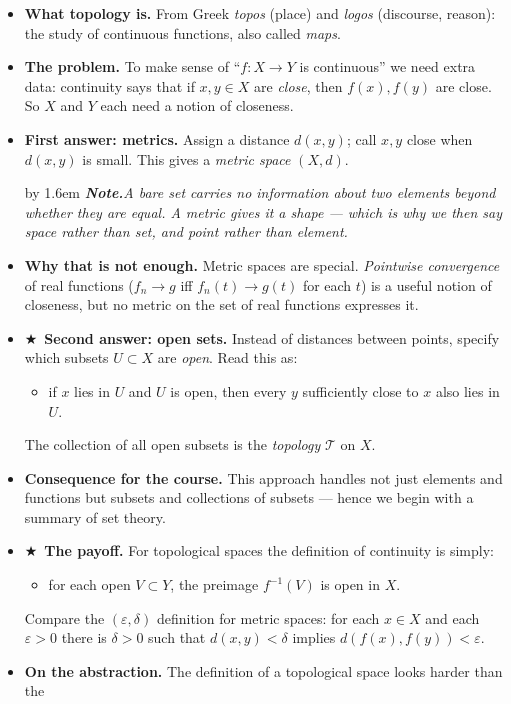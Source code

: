 \documentclass[12pt,a4paper]{article}
\newcommand{\Key}{$\bigstar$~}                  %
\newcommand{\Cue}[1]{%
  \par\addvspace{7pt}\nopagebreak
  \begingroup
    \advance\leftskip by 1.6em
    \parindent=0pt \small\color{cue}%
    \textbf{\textit{Note.}}\enspace \textit{#1}\par
  \endgroup
  \addvspace{9pt}}
\newenvironment{BL}%
  {\begin{itemize}[leftmargin=1.4em,labelsep=0.55em,itemsep=11pt,topsep=11pt,parsep=0pt]}%
  {\end{itemize}}
\newenvironment{SB}%
  {\begin{itemize}[label=--,leftmargin=1.3em,labelsep=0.45em,itemsep=6pt,topsep=7pt,parsep=0pt]}%
  {\end{itemize}}
\newcommand{\cT}{\mathcal{T}}
\begin{document}
\begin{BL}
\item \textbf{What topology is.} From Greek \emph{topos} (place) and \emph{logos}
      (discourse, reason): the study of continuous functions, also called \emph{maps}.
\item \textbf{The problem.} To make sense of ``$f\colon X\to Y$ is continuous'' we need extra
      data: continuity says that if $x,y\in X$ are \emph{close}, then $f(x),f(y)$ are close.
      So $X$ and $Y$ each need a notion of closeness.
\item \textbf{First answer: metrics.} Assign a distance $d(x,y)$; call $x,y$ close when
      $d(x,y)$ is small. This gives a \emph{metric space} $(X,d)$.
\Cue{A bare set carries no information about two elements beyond whether they are equal.
A metric gives it a shape --- which is why we then say \emph{space} rather than set, and
\emph{point} rather than element.}
\item \textbf{Why that is not enough.} Metric spaces are special. \emph{Pointwise convergence}
      of real functions ($f_n\to g$ iff $f_n(t)\to g(t)$ for each $t$) is a useful notion of
      closeness, but no metric on the set of real functions expresses it.
\item \Key\textbf{Second answer: open sets.} Instead of distances between points, specify which
      subsets $U\subset X$ are \emph{open}. Read this as:
  \begin{SB}
  \item if $x$ lies in $U$ and $U$ is open, then every $y$ sufficiently close to $x$ also
        lies in $U$.
  \end{SB}
  The collection of all open subsets is the \emph{topology} $\cT$ on $X$.
\item \textbf{Consequence for the course.} This approach handles not just elements and
      functions but subsets and collections of subsets --- hence we begin with a summary of
      set theory.
\item \Key\textbf{The payoff.} For topological spaces the definition of continuity is simply:
  \begin{SB}
  \item for each open $V\subset Y$, the preimage $f^{-1}(V)$ is open in $X$.
  \end{SB}
  Compare the $(\varepsilon,\delta)$ definition for metric spaces: for each $x\in X$ and each
  $\varepsilon>0$ there is $\delta>0$ such that $d(x,y)<\delta$ implies
  $d(f(x),f(y))<\varepsilon$.
\item \textbf{On the abstraction.} The definition of a topological space looks harder than the

\end{BL}
\end{document}
